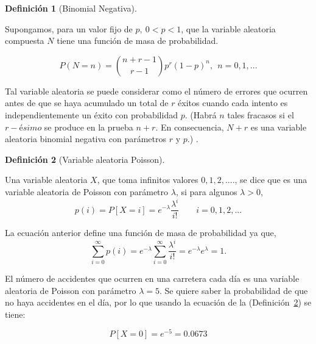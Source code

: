 \documentclass[
  us-letterpaper,
]{scrreprt}
\theoremstyle{plain}
\theoremstyle{plain}
\theoremstyle{definition}
\newtheorem{definition}{Definición}[chapter]
\theoremstyle{remark}
\begin{document}
\begin{definition}[Binomial
Negativa]\protect\hypertarget{def-var_ale_bino_neg}{}\label{def-var_ale_bino_neg}

Supongamos, para un valor fijo de \(p, \ 0 < p < 1\), que la variable
aleatoria compuesta \(N\) tiene una función de masa de probabilidad.

\[
P(N =n) = \binom{n + r -1}{r-1}p^r(1-p)^n, \ \ n=0, 1, ...
\]

Tal variable aleatoria se puede considerar como el número de errores que
ocurren antes de que se haya acumulado un total de \(r\) éxitos cuando
cada intento es independientemente un éxito con probabilidad \(p\).
(Habrá \(n\) tales fracasos si el \(r-ésimo\) se produce en la prueba
\(n + r\). En consecuencia, \(N + r\) es una variable aleatoria binomial
negativa con parámetros \(r\) y \(p\).) .

\end{definition}

\begin{definition}[Variable aleatoria
Poisson]\protect\hypertarget{def-var_ale_poisson}{}\label{def-var_ale_poisson}

Una variable aleatoria \(X\), que toma infinitos valores
\(0, 1, 2, ....\), se dice que es una variable aleatoria de Poisson con
parámetro \(\lambda\), si para algunos \(\lambda >0\),
\[p(i) = P[X = i] = e^{-\lambda}\frac{\lambda^{i}}{i!} \qquad i = 0, 1, 2, ...\]

La ecuación anterior define una función de masa de probabilidad ya que,
\[\sum_{i=0}^{\infty} p(i) = e^{-\lambda} \sum_{i=0}^{\infty} \frac{\lambda^{i}}{i!} = e^{-\lambda} e^{\lambda} = 1.\]

\end{definition}

\begin{tcolorbox}[enhanced jigsaw, titlerule=0mm, opacityback=0, coltitle=black, bottomrule=.15mm, colbacktitle=quarto-callout-caution-color!10!white, toprule=.15mm, colback=white, arc=.35mm, colframe=quarto-callout-caution-color-frame, leftrule=.75mm, bottomtitle=1mm, left=2mm, toptitle=1mm, opacitybacktitle=0.6, breakable, title={Ejemplo (\textbf{\emph{Variable aleatoria de Poisson}})}, rightrule=.15mm]

El número de accidentes que ocurren en una carretera cada día es una
variable aleatoria de Poisson con parámetro \(\lambda = 5\). Se quiere
saber la probabilidad de que no haya accidentes en el día, por lo que
usando la ecuación de la (Definición~\ref{def-var_ale_poisson}) se
tiene:

\[
P[X = 0] = e^{-5} = 0.0673
\]

\end{tcolorbox}
\end{document}
